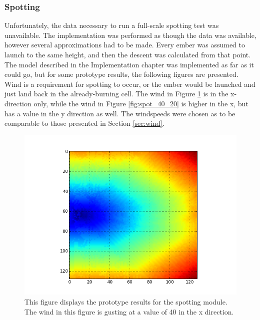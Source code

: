 \subsubsection{Spotting}
Unfortunately, the data necessary to run a full-scale spotting test was unavailable. The implementation was performed as though the data was available, however several approximations had to be made. Every ember was assumed to launch to the same height, and then the descent was calculated from that point. The model described in the Implementation chapter was implemented as far as it could go, but for some prototype results, the following figures are presented. Wind is a requirement for spotting to occur, or the ember would be launched and just land back in the already-burning cell. The wind in Figure \ref{fig:spot_40} is in the x-direction only, while the wind in Figure \ref{fig:spot_40_20} is higher in the x, but has a value in the y direction as well. The windspeeds were chosen as to be comparable to those presented in Section \ref{sec:wind}.
\begin{figure}%
\centering
  \includegraphics[height=.38\textheight]{figures/results/spot_40.png}
  \caption{This figure displays the prototype results for the spotting module. The wind in this figure is gusting at a value of 40 in the x direction.}
  \label{fig:spot_40}
\end{figure}  
